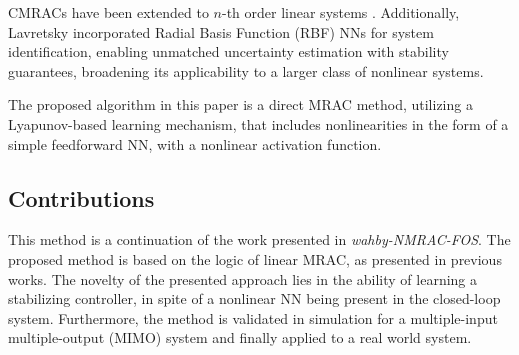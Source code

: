 CMRACs have been extended to $n$-th order linear systems \cite{lavretskyRobustAdaptiveControl2013, taoAdaptiveControlSystems2013}. Additionally, Lavretsky \cite{lavretskyCombinedCompositeModel2009} incorporated Radial Basis Function (RBF) NNs for system identification, enabling unmatched uncertainty estimation with stability guarantees, broadening its applicability to a larger class of nonlinear systems.

The proposed algorithm in this paper is a direct MRAC method, utilizing a Lyapunov-based learning mechanism, that includes nonlinearities in the form of a simple feedforward NN, with a nonlinear activation function.

\subsection{Contributions}
\label{sec:contributions}
This method is a continuation of the work presented in \textit{wahby-NMRAC-FOS}. The proposed method is based on the logic of linear MRAC, as presented in previous works. The novelty of the presented approach lies in the ability of learning a stabilizing controller, in spite of a nonlinear NN being present in the closed-loop system. Furthermore, the method is validated in simulation for a multiple-input multiple-output (MIMO) system and finally applied to a real world system.